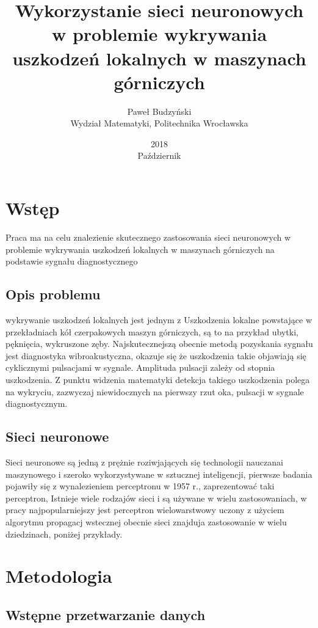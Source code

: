 \documentclass[12pt, a4paper, oneside, draft]{article}
\author{Paweł Budzyński \\ Wydział Matematyki, Politechnika Wrocławska}
\title{\textbf{Wykorzystanie sieci neuronowych w problemie wykrywania uszkodzeń lokalnych w maszynach górniczych}}
\date{2018 \\ Październik}
\newcommand{\mychapter}[2]{
	\setcounter{chapter}{#1}
	\setcounter{section}{0}
	\chapter*{#2}
	\addcontentsline{toc}{chapter}{#2}
}
\begin{document}
	\maketitle
	\section{Wstęp}
	Praca ma na celu znalezienie skutecznego zastosowania sieci neuronowych w problemie wykrywania uszkodzeń lokalnych w maszynach górniczych na podstawie sygnału diagnostycznego
	
	\subsection{Opis problemu}
	wykrywanie uszkodzeń lokalnych jest jednym z \cite{Zimroz01}
	Uszkodzenia lokalne powstające w przekładniach kół czerpakowych maszyn górniczych, są to na przykład ubytki, pęknięcia, wykruszone zęby.  Najskutecznejszą obecnie metodą pozyskania sygnału jest diagnostyka wibroakustyczna, okazuje się że uszkodzenia takie objawiają się cyklicznymi pulsacjami w sygnale. Amplituda pulsacji zależy od stopnia uszkodzenia. Z punktu widzenia matematyki detekcja takiego uszkodzenia polega na wykryciu, zazwyczaj niewidocznych na pierwszy rzut oka, pulsacji w sygnale diagnostycznym. 
	
	
	\subsection{Sieci neuronowe}
	Sieci neuronowe są jedną z prężnie roziwjających się technologii nauczanai maszynowego i szeroko wykorzystywane w sztucznej inteligencji,
	pierwsze badania pojawiły się z wynalezieniem perceptronu w 1957 r., zaprezentować taki perceptron,
	Istnieje wiele rodzajów sieci i są używane w wielu zastosowaniach, w pracy najpopularniejszy jest perceptron wielowarstwowy uczony z użyciem algorytmu propagacj wstecznej 
	obecnie sieci znajduja zastosowanie w wielu dziedzinach, poniżej przykłady.
	
	
	\section{Metodologia}
	
	\subsection{Wstępne przetwarzanie danych}
	\cite{Python}
\end{document}
